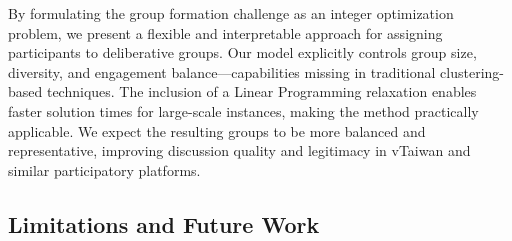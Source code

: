 By formulating the group formation challenge as an integer optimization problem,
we present a flexible and interpretable approach for assigning participants to deliberative groups.
Our model explicitly controls group size, diversity,
and engagement balance—capabilities missing in traditional clustering-based techniques.
The inclusion of a Linear Programming relaxation enables faster solution times for large-scale instances,
making the method practically applicable.
We expect the resulting groups to be more balanced and representative, improving discussion quality
and legitimacy in vTaiwan and similar participatory platforms.

\subsection*{Limitations and Future Work}
